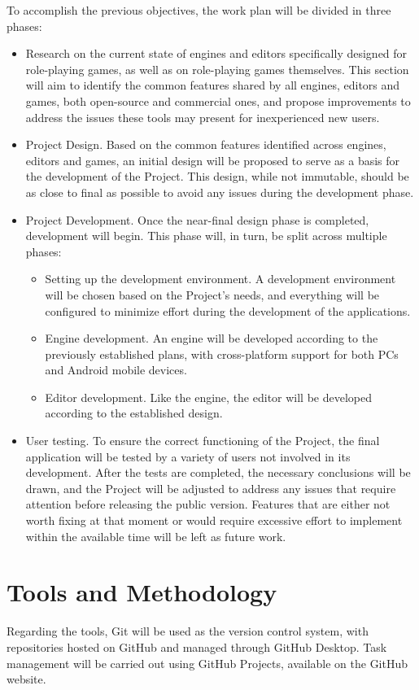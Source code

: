 To accomplish the previous objectives, the work plan will be divided in three phases: 
\begin{itemize}
	\item Research on the current state of engines and editors specifically designed for role-playing games, as well as on role-playing games themselves. This section will aim to identify the common features shared by all engines, editors and games, both open-source and commercial ones, and propose improvements to address the issues these tools may present for inexperienced new users. 
	\item Project Design. Based on the common features identified across engines, editors and games, an initial design will be proposed to serve as a basis for the development of the Project. This design, while not immutable, should be as close to final as possible to avoid any issues during the development phase.
	\item Project Development. Once the near-final design phase is completed, development will begin. This phase will, in turn, be split across multiple phases:
		\begin{itemize}
			\item Setting up the development environment. A development environment will be chosen based on the Project's needs, and everything will be configured to minimize effort during the development of the applications.
			\item Engine development. An engine will be developed according to the previously established plans, with cross-platform support for both PCs and Android mobile devices.
			\item Editor development. Like the engine, the editor will be developed according to the established design.
		\end{itemize}
	\item User testing. To ensure the correct functioning of the Project, the final application will be tested by a variety of users not involved in its development. After the tests are completed, the necessary conclusions will be drawn, and the Project will be adjusted to address any issues that require attention before releasing the public version. Features that are either not worth fixing at that moment or would require excessive effort to implement within the available time will be left as future work.
\end{itemize}


\section*{Tools and Methodology}
Regarding the tools, Git will be used as the version control system, with repositories hosted on GitHub and managed through GitHub Desktop. Task management will be carried out using GitHub Projects, available on the GitHub website.

